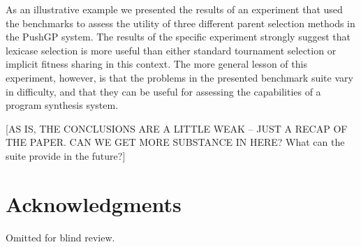 \documentclass{sig-alternate}
\begin{document}
As an illustrative example we presented the results of an experiment that used the benchmarks to assess the utility of three different parent selection methods in the PushGP system.%
The results of the specific experiment strongly suggest that lexicase selection %
 is more useful than either standard tournament selection or implicit fitness sharing %
 in this context. The more general lesson of this experiment, however, is that the problems in the presented benchmark suite vary in difficulty, and that they can be useful for assessing the capabilities of a program synthesis system.

[AS IS, THE CONCLUSIONS ARE A LITTLE WEAK -- JUST A RECAP OF THE PAPER. CAN WE GET MORE SUBSTANCE IN HERE? What can the suite provide in the future?]


\section{Acknowledgments}
Omitted for blind review.
\end{document}
